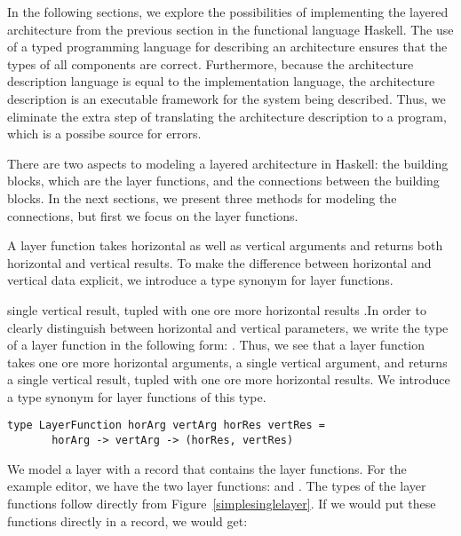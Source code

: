In the following sections, we explore the possibilities of implementing the layered architecture from the previous section in the functional language Haskell. The use of a typed programming language for describing an architecture ensures that the types of all components are correct. Furthermore, because the architecture description language is equal to the implementation language, the architecture description is an executable framework for the system being described. Thus, we eliminate the extra step of translating the architecture description to a program, which is a possibe source for errors.


There are two aspects to modeling a layered architecture in Haskell: the building blocks, which are the layer functions, and the connections between the building blocks. In the next sections, we present three methods for modeling the connections, but first we focus on the layer functions. 

A layer function takes  horizontal as well as vertical arguments and returns both  horizontal and vertical results. To make the difference between horizontal and vertical data explicit, we introduce a type synonym for layer functions.

\bc single vertical result, tupled with one ore more horizontal results .In order to clearly distinguish between horizontal and vertical parameters, we write the type of a layer function in the following form: . Thus, we see that a layer function takes one ore more horizontal arguments, a single vertical argument, and returns a single vertical result, tupled with one ore more horizontal results. We introduce a type synonym for layer functions of this type. \ec


\begin{small}
\begin{verbatim}
type LayerFunction horArg vertArg horRes vertRes =
       horArg -> vertArg -> (horRes, vertRes)
\end{verbatim}
\end{small}

We model a layer with a record that contains the layer functions. For the example editor, we have the two layer functions:  and . The types of the layer functions follow directly from Figure~\ref{simplesinglelayer}.  If we would put these functions directly in a record, we would get:

